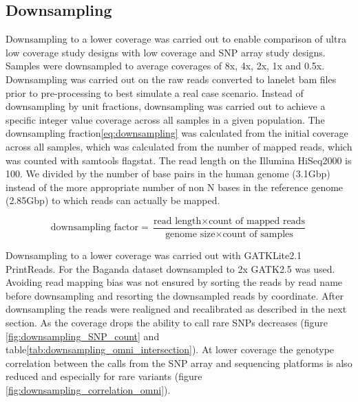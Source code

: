 \subsection{Downsampling}
Downsampling to a lower coverage was carried out to enable comparison of ultra low coverage study designs with low coverage and SNP array study designs. Samples were downsampled to average coverages of 8x, 4x, 2x, 1x and 0.5x. Downsampling was carried out on the raw reads converted to lanelet bam files prior to pre-processing to best simulate a real case scenario. Instead of downsampling by unit fractions\cite{10.1371/journal.pcbi.1002604}, downsampling was carried out to achieve a specific integer value coverage across all samples in a given population. The downsampling fraction\ref{eq:downsampling} was calculated from the initial coverage across all samples, which was calculated from the number of mapped reads, which was counted with samtools\cite{Li15082009} flagstat. The read length on the Illumina HiSeq2000 is 100. We divided by the number of base pairs in the human genome (3.1\gls{Gbp}) instead of the more appropriate number of non N bases in the reference genome (2.85\gls{Gbp}) to which reads can actually be mapped.

\begin{equation}
\text{downsampling factor} =  \frac
{\text{read length} \times \text{count of mapped reads}}
{\text{genome size} \times \text{count of samples}}
\label{eq:downsampling}
\end{equation}

Downsampling to a lower coverage was carried out with \gls{GATK}Lite2.1 PrintReads.\cite{DePristo2011} For the Baganda dataset downsampled to 2x \gls{GATK}2.5 was used. Avoiding read mapping bias was not ensured by sorting the reads by read name before downsampling and resorting the downsampled reads by coordinate. After downsampling the reads were realigned and recalibrated as described in the next section.
As the coverage drops the ability to call rare \glspl{SNP} decreases (figure \ref{fig:downsampling_SNP_count} and table\ref{tab:downsampling_omni_intersection}). At lower coverage the genotype correlation between the calls from the SNP array and sequencing platforms is also reduced and especially for rare variants (figure \ref{fig:downsampling_correlation_omni}).

